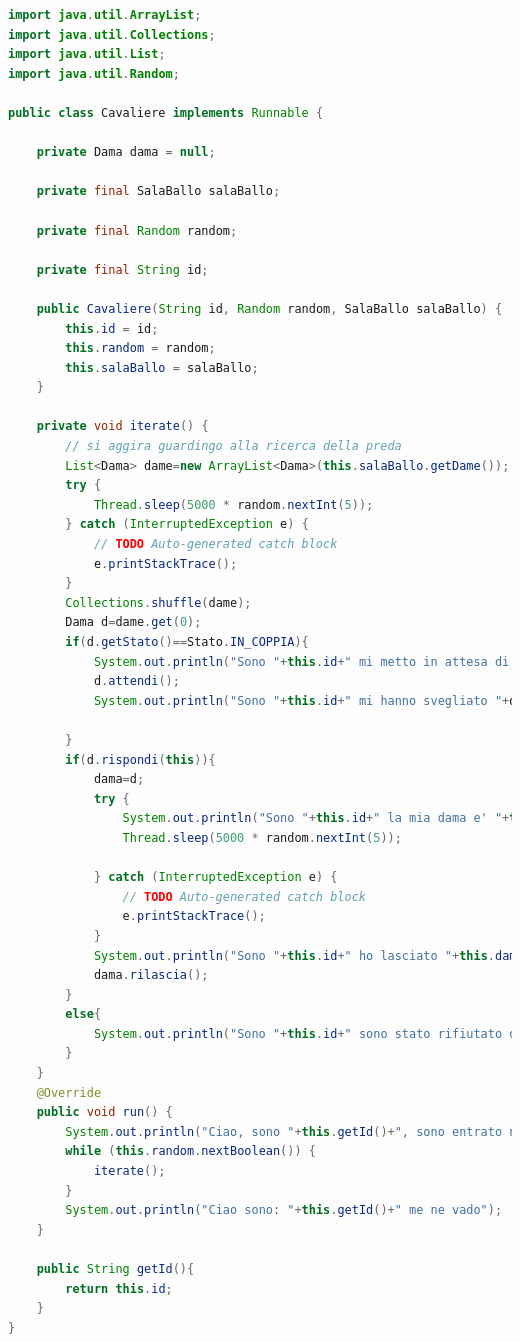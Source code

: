 \documentclass{article}
\begin{document}
\begin{lstlisting}[language=Java]
import java.util.ArrayList;
import java.util.Collections;
import java.util.List;
import java.util.Random;

public class Cavaliere implements Runnable {

	private Dama dama = null;

	private final SalaBallo salaBallo;

	private final Random random;

	private final String id;

	public Cavaliere(String id, Random random, SalaBallo salaBallo) {
		this.id = id;
		this.random = random;
		this.salaBallo = salaBallo;
	}

	private void iterate() {
		// si aggira guardingo alla ricerca della preda
		List<Dama> dame=new ArrayList<Dama>(this.salaBallo.getDame());
		try {
			Thread.sleep(5000 * random.nextInt(5));
		} catch (InterruptedException e) {
			// TODO Auto-generated catch block
			e.printStackTrace();
		}
		Collections.shuffle(dame);
		Dama d=dame.get(0);
		if(d.getStato()==Stato.IN_COPPIA){
			System.out.println("Sono "+this.id+" mi metto in attesa di "+d.getName());
			d.attendi();
			System.out.println("Sono "+this.id+" mi hanno svegliato "+d.getName()+" si e' lasciata");
			
		}
		if(d.rispondi(this)){
			dama=d;
			try {
				System.out.println("Sono "+this.id+" la mia dama e' "+this.dama.getName());
				Thread.sleep(5000 * random.nextInt(5));
				
			} catch (InterruptedException e) {
				// TODO Auto-generated catch block
				e.printStackTrace();
			}
			System.out.println("Sono "+this.id+" ho lasciato "+this.dama.getName());
			dama.rilascia();
		}
		else{
			System.out.println("Sono "+this.id+" sono stato rifiutato da "+d.getName());
		}
	}
	@Override
	public void run() {
		System.out.println("Ciao, sono "+this.getId()+", sono entrato nella sala da ballo");
		while (this.random.nextBoolean()) {
			iterate();
		}
		System.out.println("Ciao sono: "+this.getId()+" me ne vado");
	}
	
	public String getId(){
		return this.id;
	}
}
\end{lstlisting}
\end{document}
